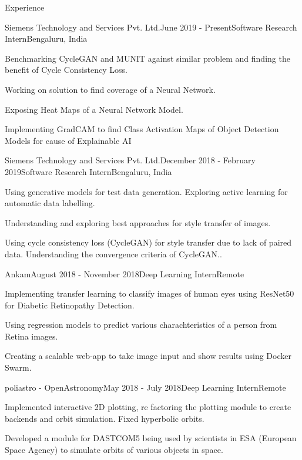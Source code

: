 \documentclass{resume} %
\begin{document}
\begin{rSection}{Experience}

\begin{rSubsection}{Siemens Technology and Services Pvt. Ltd.}{June 2019 - Present}{Software Research Intern}{Bengaluru, India}
\item Benchmarking CycleGAN and MUNIT against similar problem and finding the benefit of Cycle Consistency Loss.
\item Working on solution to find coverage of a Neural Network.
\item Exposing Heat Maps of a Neural Network Model.
\item Implementing GradCAM to find Class Activation Maps of Object Detection Models for cause of Explainable AI
\end{rSubsection}


\begin{rSubsection}{Siemens Technology and Services Pvt. Ltd.}{December 2018 - February 2019}{Software Research Intern}{Bengaluru, India}
\item Using generative models for test data generation. Exploring active learning
for automatic data labelling.
\item Understanding and exploring best approaches for style transfer of images.
\item Using cycle consistency loss (CycleGAN) for style transfer due to lack of paired data. Understanding the convergence criteria of CycleGAN..
\end{rSubsection}


\begin{rSubsection}{Ankam}{August 2018 - November 2018}{Deep Learning Intern}{Remote}
\item Implementing transfer learning to classify images of human eyes using
ResNet50 for Diabetic Retinopathy Detection.
\item Using regression models to predict various charachteristics of a person from Retina images. 
\item Creating a scalable web-app to take image input and show results using Docker Swarm.
\end{rSubsection}


\begin{rSubsection}{poliastro - OpenAstronomy}{May 2018 - July 2018}{Deep Learning Intern}{Remote}
\item Implemented interactive 2D plotting, re factoring the plotting module to
create backends and orbit simulation. Fixed hyperbolic orbits.
\item Developed a module for DASTCOM5 being used by scientists in ESA (European Space Agency) to simulate orbits of various objects in space.
\end{rSubsection}

\end{rSection}
\end{document}
